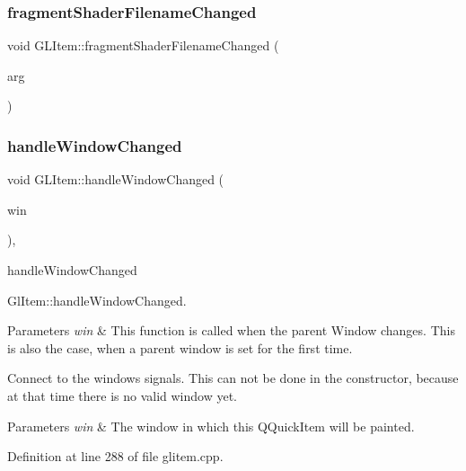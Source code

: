 \subsubsection{\texorpdfstring{fragmentShaderFilenameChanged}{fragmentShaderFilenameChanged}}
{\footnotesize\ttfamily void G\+L\+Item\+::fragment\+Shader\+Filename\+Changed (\begin{DoxyParamCaption}\item[{Q\+String}]{arg }\end{DoxyParamCaption})\hspace{0.3cm}{\ttfamily [signal]}}

\mbox{\label{class_g_l_item_a95c8f2a7aa5d735bf73b7566fd4d12da}} 
\subsubsection{\texorpdfstring{handleWindowChanged}{handleWindowChanged}}
{\footnotesize\ttfamily void G\+L\+Item\+::handle\+Window\+Changed (\begin{DoxyParamCaption}\item[{Q\+Quick\+Window $\ast$}]{win }\end{DoxyParamCaption})\hspace{0.3cm}{\ttfamily [protected]}, {\ttfamily [slot]}}



handle\+Window\+Changed 

Gl\+Item\+::handle\+Window\+Changed.


\begin{DoxyParams}{Parameters}
{\em win} & This function is called when the parent Window changes. This is also the case, when a parent window is set for the first time.\\
\hline
\end{DoxyParams}
Connect to the window\textquotesingle{}s signals. This can not be done in the constructor, because at that time there is no valid window yet. 
\begin{DoxyParams}{Parameters}
{\em win} & The window in which this Q\+Quick\+Item will be painted. \\
\hline
\end{DoxyParams}


Definition at line 288 of file glitem.\+cpp.

\mbox{\label{class_g_l_item_ab14e096f79b7499d20e9cbcf69bf181a}} 
